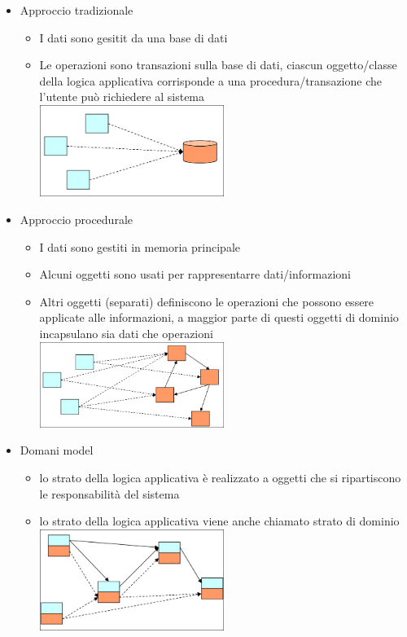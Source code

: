 \documentclass{article}
\begin{document}
\begin{itemize}
    \item Approccio \vopen tradizionale\vclose
        \begin{itemize}
            \item I dati sono gesitit da una base di dati
            \item Le operazioni sono transazioni sulla base di dati, ciascun oggetto/classe della logica applicativa corrisponde a una procedura/transazione che l'utente può richiedere al sistema\\
            \includegraphics[width=6cm]{images/approccio tradizionale.png}
        \end{itemize}
    \item Approccio \vopen procedurale\vclose
        \begin{itemize}
            \item I dati sono gestiti in memoria principale
            \item Alcuni oggetti sono usati per rappresentarre dati/informazioni
            \item Altri oggetti (separati) definiscono le operazioni che possono essere applicate alle informazioni, a maggior parte di questi oggetti di dominio incapsulano sia dati che operazioni\\
            \includegraphics[width=6cm]{images/approccio procedurale.png}
        \end{itemize}
    \item Domani model
        \begin{itemize}
            \item lo strato della logica applicativa è realizzato a oggetti che si ripartiscono le responsabilità del sistema
            \item lo strato della logica applicativa viene anche chiamato strato
            di dominio\\
            \includegraphics[width=6cm]{images/strato di dominio.png}
        \end{itemize}
\end{itemize}
\end{document}
